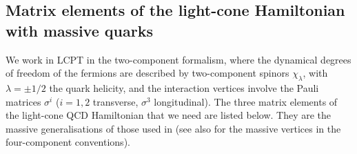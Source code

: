 \documentclass[11pt,a4paper]{article}
\numberwithin{equation}{section}
\begin{document}
\subsection{Matrix elements of the light-cone Hamiltonian with massive quarks}
\label{sec:matrix}

We work in LCPT in the two-component formalism, where the dynamical degrees of freedom of the
fermions are described by two-component spinors $\chi_{\lambda}$, with $\lambda=\pm 1/2$ the
quark helicity, and the interaction vertices involve the Pauli matrices $\sigma^i$ ($i=1,2$
transverse, $\sigma^3$ longitudinal). The three matrix elements of the light-cone QCD
Hamiltonian that we need are listed below. They are the massive generalisations of those used
in \cite{Iancu:2022gpw} (see also \cite{Beuf:2021qqa,Beuf:2022ndu} for the massive vertices in
the four-component conventions).
\end{document}
